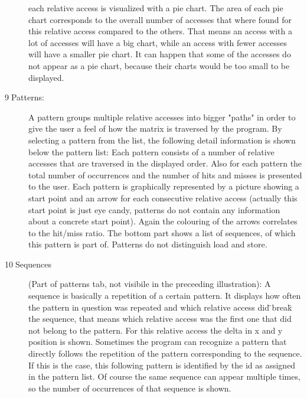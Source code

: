 \begin{description}
each relative access is visualized with a pie chart. The area of each
pie chart corresponds to the overall number of accesses that where
found for this relative access compared to the others. That means
an access with a lot of accesses will have a big chart, while an access
with fewer accesses will have a smaller pie chart. It can happen that
some of the accesses do not appear as a pie chart, because their charts
would be too small to be displayed.
\item [{9$\;$Patterns:}] A pattern groups multiple relative accesses
into bigger "paths" in order to give the user a feel of how the matrix
is traversed by the program. By selecting a pattern from the list,
the following detail information is shown below the pattern list:
Each pattern consists of a number of relative accesses that are traversed
in the displayed order. Also for each pattern the total number of
occurrences and the number of hits and misses is presented to the
user. Each pattern is graphically represented by a picture showing
a start point and an arrow for each consecutive relative access (actually
this start point is just eye candy, patterns do not contain any information
about a concrete start point). Again
the colouring of the arrows correlates to the hit/miss ratio. The
bottom part shows a list of sequences, of which this pattern is part
of. Patterns do not distinguish load and store.
\item [{10$\;$Sequences}] (Part of patterns tab, not visibile in the preceeding
illustration): A sequence is basically a repetition of a certain pattern.
It displays how often the pattern in question was repeated and which
relative access did \"{}break\"{} the sequence,
that means which relative access was the first one that did not belong
to the pattern. For this relative access the delta in x and y position
is shown. Sometimes the program can recognize a pattern that directly
follows the repetition of the pattern corresponding to the sequence.
If this is the case, this following pattern is identified by the id
as assigned in the pattern list. Of course the same sequence can appear
multiple times, so the number of occurrences of that sequence is shown.\end{description}
